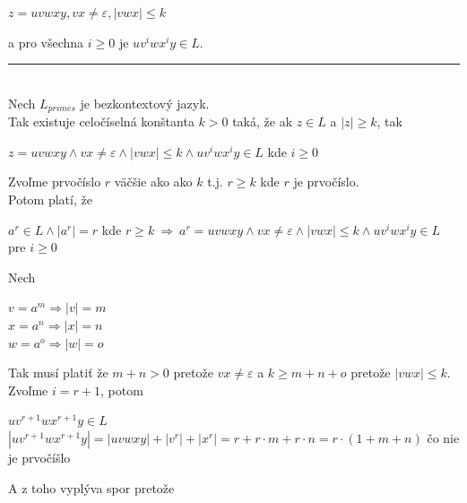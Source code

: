 \documentclass[11pt,a4paper]{article}
\begin{document}
\begin{center}
$z = uvwxy, vx \neq \varepsilon, |vwx| \leq k$
\end{center}

a pro všechna $i \geq 0$ je $uv^{i}wx^{i}y \in L$.

\rule{17cm}{0.4pt}

\hfill\\[-2em]

Nech $L_{primes}$ je bezkontextový jazyk.\\

Tak existuje celočíselná konštanta $k > 0$ taká, že ak $z \in L$ a $|z| \geq k$, tak

\begin{center}
$z = uvwxy \wedge vx \neq \varepsilon \wedge |vwx| \leq k \wedge uv^{i}wx^{i}y \in L$ kde $i \geq 0$\\
\end{center}

Zvoľme prvočíslo $r$ väčšie ako ako $k$ t.j. $r \geq k$ kde $r$ je prvočíslo.\\

Potom platí, že

\begin{center}
$a^{r} \in L \wedge |a^{r}| = r$ kde $r \geq k \ \Longrightarrow \ a^{r} = uvwxy \wedge vx \neq \varepsilon \wedge |vwx| \leq k \wedge uv^{i}wx^{i}y \in L$ pre $i \geq 0$\\
\end{center}

Nech
\begin{center}
$v = a^{m} \Rightarrow |v| = m$\\
$x = a^{n} \Rightarrow |x| = n$\\
$w = a^{o} \Rightarrow |w| = o$\\
\end{center}

Tak musí platiť že $m+n > 0$ pretože $vx \neq \varepsilon$ a $k \geq m+n+o$ pretože $|vwx| \leq k$.\\

Zvoľme $i=r+1$, potom

\begin{center}
$uv^{r+1}wx^{r+1}y \in L$\\[0.5em]
$|uv^{r+1}wx^{r+1}y| = |uvwxy| + |v^{r}| + |x^{r}| = r + r \cdot m + r \cdot n = r \cdot (1+m+n)$ čo nie je prvočíšlo\\
\end{center}

A z toho vyplýva spor pretože
\end{document}
